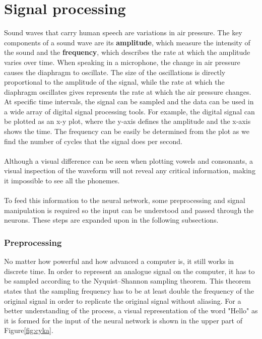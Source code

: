 \section{Signal processing}
Sound waves that carry human speech are variations in air pressure.
The key components of a sound wave are its \textbf{amplitude},
which measure the intensity of the sound and the \textbf{frequency}, which describes the rate at which the amplitude varies over time.
When speaking in a microphone,
the change in air pressure causes the diaphragm to oscillate.
The size of the oscillations is directly proportional to the amplitude of the signal,
while the rate at which the diaphragm oscillates gives represents the rate at which the air pressure changes.
At specific time intervals,
the signal can be sampled and the data can be used in a wide array of digital signal processing tools.
For example, the digital signal can be plotted as an x-y plot,
where the y-axis defines the amplitude and the x-axis shows the time.
The frequency can be easily be determined from the plot as we find the number of cycles that the signal does per second.\\\\
Although a visual difference can be seen when plotting vowels and consonants,
a visual inspection of the waveform will not reveal any critical information, making it impossible to see all the phonemes.\\\\
To feed this information to the neural network, some preprocessing and signal manipulation is required so the input can be understood and passed through the neurons.
These steps are expanded upon in the following subsections.

\subsubsection{ Preprocessing}
No matter how powerful and how advanced a computer is,
it still works in discrete time.
In order to represent an analogue signal on the computer, it has to be sampled according to the Nyquist–Shannon sampling theorem.
This theorem states that the sampling frequency has to be at least double the frequency of the original signal in order to replicate the original signal without aliasing.
For a better understanding of the process, a visual representation of the word "Hello" as it is formed for the input of the neural network is shown in the upper part of Figure\ref{fig:cyka}.

